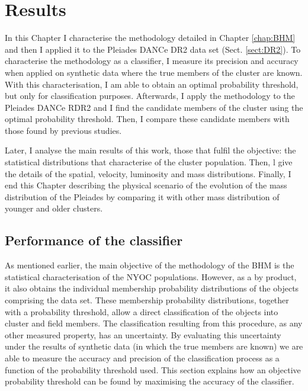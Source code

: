 \chapter{Results}
\label{chap:Results}
In this Chapter I characterise the methodology detailed in Chapter  \ref{chap:BHM} and then I applied it to the Pleiades DANCe DR2 data set (Sect. \ref{sect:DR2}). To characterise the methodology as a classifier, I measure its precision and accuracy when applied on synthetic data where the true members of the cluster are known. With this characterisation, I am able to obtain an optimal probability threshold, but only for classification purposes. Afterwards, I apply the methodology to the Pleiades DANCe RDR2 and I find the candidate members of the cluster using the optimal probability threshold. Then, I compare these candidate members with those found by previous studies.

Later, I analyse the main results of this work, those that fulfil the objective: the statistical distributions that characterise of the cluster population. Then, l give the details of the spatial, velocity, luminosity and mass distributions. Finally, I end this Chapter describing the physical scenario of the evolution of the mass distribution of the Pleiades by comparing it with other mass distribution of younger and older clusters.

\section{Performance of the classifier}
\label{sect:classifier}
As mentioned earlier, the main objective of the methodology of the BHM is the statistical characterisation of the NYOC populations. However, as a by product, it also obtains the individual membership probability distributions of the objects comprising the data set. These membership probability distributions, together with a probability threshold, allow a direct classification of the objects into cluster and field members.  The classification resulting from this procedure, as any other measured property, has an uncertainty. By evaluating this uncertainty under the results of synthetic data (in which the true members are known) we are able to measure the accuracy and precision of the classification process as a function of the probability threshold used. This section explains how an objective probability threshold can be found by maximising the accuracy of the classifier. 

